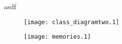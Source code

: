 \documentclass{article}
\begin{document}
	
asdf
	\begin{figure}[h!]
	\centering 
	\texttt{[image: class\_diagramtwo.1]}  
	\end{figure}

	\begin{figure}[h!]
	\centering 
	\texttt{[image: memories.1]}  
\end{figure}
\end{document}
